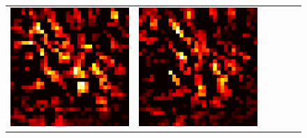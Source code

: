 \documentclass[preprint,12pt]{elsarticle}
\begin{document}
\begin{figure}[p]
\begin{tabular}{cccccc}
  \includegraphics[scale=\scale]{../visualizations/examples/cifar10/cnn/active_saliency_map/4.png} & 
  \includegraphics[scale=\scale]{../visualizations/examples/cifar10/cnn/inactive_saliency_map/4.png} \\
  

\end{tabular}
\end{figure}
\end{document}
